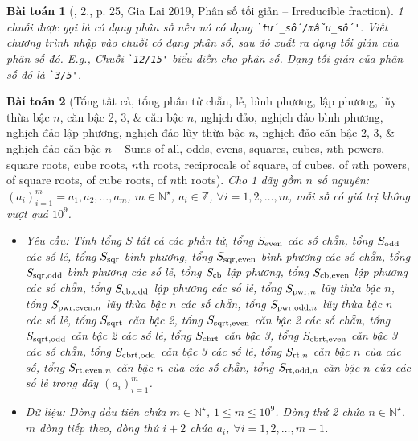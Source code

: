 \documentclass{article}
\newtheorem{baitoan}{Bài toán}
\begin{document}
\begin{baitoan}[\cite{VietSTEM2021}, 2., p. 25, Gia Lai 2019, Phân số tối giản -- Irreducible fraction]
	1 chuỗi được gọi là có dạng phân số nếu nó có dạng \verb|`tử_số/mẫu_số'|. Viết chương trình nhập vào chuỗi có dạng phân số, sau đó xuất ra dạng tối giản của phân số đó. E.g., Chuỗi \verb|`12/15'| biểu diễn cho phân số. Dạng tối giản của phân số đó là \verb|`3/5'|.
\end{baitoan}

\begin{baitoan}[Tổng tất cả, tổng phần tử chẵn, lẻ, bình phương, lập phương, lũy thừa bậc $n$, căn bậc 2, 3, \& căn bậc $n$, nghịch đảo, nghịch đảo bình phương, nghịch đảo lập phương, nghịch đảo lũy thừa bậc $n$, nghịch đảo căn bậc 2, 3, \& nghịch đảo căn bậc $n$ -- Sums of all, odds, evens, squares, cubes, $n$th powers, square roots, cube roots, $n$th roots, reciprocals of square, of cubes, of $n$th powers, of square roots, of cube roots, of $n$th roots]
	Cho 1 dãy gồm $n$ số nguyên: $(a_i)_{i=1}^m = a_1,a_2,\ldots,a_m$, $m\in\mathbb{N}^\star$, $a_i\in\mathbb{Z}$, $\forall i = 1,2,\ldots,m$, mỗi số có giá trị không vượt quá $10^9$.
	\begin{itemize}
		\item {\sf Yêu cầu:} Tính tổng $S$ tất cả các phần tử, tổng $S_{\rm even}$ các số chẵn, tổng $S_{\rm odd}$ các số lẻ, tổng $S_{\rm sqr}$ bình phương, tổng $S_{\rm sqr,even}$ bình phương các số chẵn, tổng $S_{\rm sqr,odd}$ bình phương các số lẻ, tổng $S_{\rm cb}$ lập phương, tổng $S_{\rm cb,even}$ lập phương các số chẵn, tổng $S_{\rm cb,odd}$ lập phương các số lẻ, tổng $S_{{\rm pwr},n}$ lũy thừa bậc $n$, tổng $S_{{\rm pwr,even},n}$ lũy thừa bậc $n$ các số chẵn, tổng $S_{{\rm pwr,odd},n}$ lũy thừa bậc $n$ các số lẻ, tổng $S_{\rm sqrt}$ căn bậc 2, tổng $S_{\rm sqrt,even}$ căn bậc 2 các số chẵn, tổng $S_{\rm sqrt,odd}$ căn bậc 2 các số lẻ, tổng $S_{\rm cbrt}$ căn bậc 3, tổng $S_{\rm cbrt,even}$ căn bậc 3 các số chẵn, tổng $S_{\rm cbrt,odd}$ căn bậc 3 các số lẻ, tổng $S_{{\rm rt},n}$ căn bậc $n$ của các số, tổng $S_{{\rm rt,even},n}$ căn bậc $n$ của các số chẵn, tổng $S_{{\rm rt,odd},n}$ căn bậc $n$ của các số lẻ trong dãy $(a_i)_{i=1}^m$.
		\item {\sf Dữ liệu:} Dòng đầu tiên chứa $m\in\mathbb{N}^\star$, $1\le m\le10^9$. Dòng thứ 2 chứa $n\in\mathbb{N}^\star$. $m$ dòng tiếp theo, dòng thứ $i + 2$ chứa $a_i$, $\forall i = 1,2,\ldots,m - 1$.
	\end{itemize}
\end{baitoan}
\end{document}
